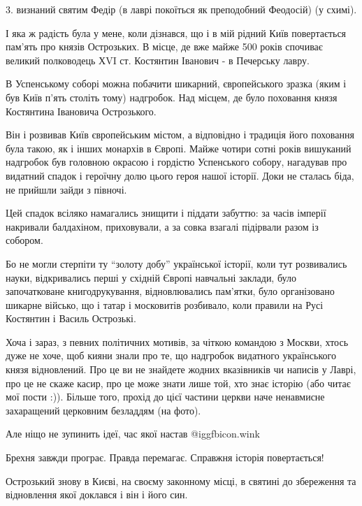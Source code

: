 3. визнаний святим Федір (в лаврі покоїться як преподобний Феодосій) (у схимі).

І яка ж радість була у мене, коли дізнався, що і в мій рідний Київ повертається
пам’ять про князів Острозьких. В місце, де вже майже 500 років спочиває великий
полководець ХVI ст. Костянтин Іванович - в Печерську лавру.


В Успенському соборі можна побачити шикарний, європейського зразка (яким і був
Київ п’ять століть тому) надгробок. Над місцем, де було поховання князя
Костянтина Івановича Острозького. 

Він і розвивав Київ європейським містом, а відповідно і традиція його поховання
була такою, як і інших монархів в Європі. Майже чотири сотні років вишуканий
надгробок був головною окрасою і гордістю Успенського собору, нагадував про
видатний спадок і героїчну долю цього героя нашої історії. Доки не сталась
біда, не прийшли зайди з півночі.


Цей спадок всіляко намагались знищити і піддати забуттю: за часів імперії
накривали балдахіном, приховували, а за совка взагалі підірвали разом із
собором. 

Бо не могли стерпіти ту \enquote{золоту добу} української історії, коли тут
розвивались науки, відкривались перші у східній Європі навчальні заклади, було
започатковане книгодрукування, відновлювались пам’ятки, було організовано
шикарне військо, що і татар і московитів розбивало, коли правили на Русі
Костянтин і Василь Острозькі.  

Хоча і зараз, з певних політичних мотивів, за чіткою командою з Москви, хтось
дуже не хоче, щоб кияни знали про те, що надгробок видатного українського князя
відновлений. Про це ви не знайдете жодних вказівників чи написів у Лаврі, про
це не скаже касир, про це може знати лише той, хто знає історію (або читає мої
пости :)). Більше того, прохід до цієї частини церкви наче ненавмисне
захаращений церковним безладдям (на фото). 

Але ніщо не зупинить ідеї, час якої настав  @igg{fbicon.wink}  

Брехня завжди програє. Правда перемагає. Справжня історія повертається!

Острозький знову в Києві, на своєму законному місці, в святині до збереження та
відновлення якої доклався і він і його син. 

